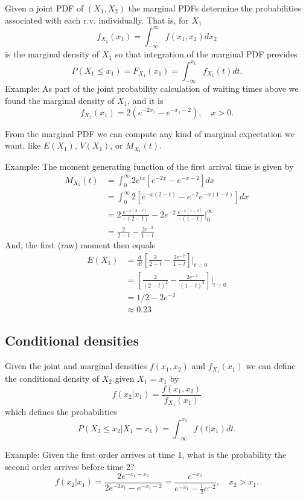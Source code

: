 \documentclass[
]{book}
\begin{document}
Given a joint PDF of \((X_1, X_2)\) the marginal PDFs determine the probabilities associated with each r.v. individually. That is, for \(X_1\)
\[f_{X_1}(x_1) = \int_{-\infty}^\infty f(x_1, x_2) dx_2\]
is the marginal density of \(X_1\) so that integration of the marginal PDF provides
\[P(X_1\leq x_1) = F_{X_1}(x_1) = \int_{-\infty}^{x_1} f_{X_1}(t)dt.\]
Example: As part of the joint probability calculation of waiting times above we found the marginal density of \(X_1\), and it is
\[f_{X_1}(x_1) = 2(e^{-2x_1} - e^{-x_1-2}), \quad x>0.\]

From the marginal PDF we can compute any kind of marginal expectation we want, like \(E(X_1)\), \(V(X_1)\), or \(M_{X_1}(t)\).

Example: The moment generating function of the first arrival time is given by
\begin{align*}
M_{X_1}(t) &= \int_{0}^\infty 2e^{tx}[e^{-2x}-e^{-x-2}]dx\\
& = \int_{0}^\infty 2[e^{-x(2-t)}-e^{-2}e^{-x(1-t)}]dx\\
& = 2\frac{e^{-x(2-t)}}{-(2-t)} -2e^{-2}\frac{e^{-x(1-t)}}{-(1-t)}|_0^{\infty}\\
& = \frac{2}{2-t} - \frac{2e^{-2}}{1-t}
\end{align*}
And, the first (raw) moment then equals
\begin{align*}
E(X_1) &= \frac{d}{dt}[\frac{2}{2-t} - \frac{2e^{-2}}{1-t}]|_{t=0}\\
&= [\frac{2}{(2-t)^2} - \frac{2e^{-2}}{(1-t)^2}]|_{t=0}\\
& = 1/2 - 2e^{-2}\\
& \approx 0.23
\end{align*}

\hypertarget{conditional-densities}{%
\subsection{Conditional densities}\label{conditional-densities}}

Given the joint and marginal densities \(f(x_1, x_2)\) and \(f_{X_1}(x_1)\) we can define the conditional density of \(X_2\) given \(X_1=x_1\) by
\[f(x_2|x_1) = \frac{f(x_1, x_2)}{f_{X_1}(x_1)}\]
which defines the probabilities
\[P(X_2\leq x_2|X_1=x_1) = \int_{-\infty}^{x_2} f(t|x_1)dt.\]

Example: Given the first order arrives at time 1, what is the probability the second order arrives before time 2?
\[f(x_2|x_1) = \frac{2e^{-x_1-x_2}}{2e^{-2x_1}-e^{-x_1-2}} = \frac{e^{-x_2}}{e^{-x_1}-\tfrac12 e^{-2}}, \quad x_2>x_1.\]
\end{document}
